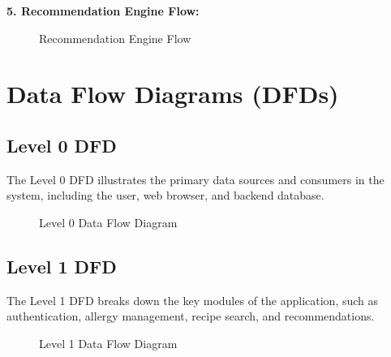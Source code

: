 \documentclass[12pt,a4paper]{report}
\begin{document}
\textbf{5. Recommendation Engine Flow:}
\begin{figure}[h!]
  \centering
  \caption{Recommendation Engine Flow}
\end{figure}

\section{Data Flow Diagrams (DFDs)}
\subsection{Level 0 DFD}
The Level 0 DFD illustrates the primary data sources and consumers in the system, including the user, web browser, and backend database.
\begin{figure}[h!]
  \centering
  \caption{Level 0 Data Flow Diagram}
\end{figure}

\subsection{Level 1 DFD}
The Level 1 DFD breaks down the key modules of the application, such as authentication, allergy management, recipe search, and recommendations.
\begin{figure}[h!]
  \centering
  \caption{Level 1 Data Flow Diagram}
\end{figure}
\end{document}
